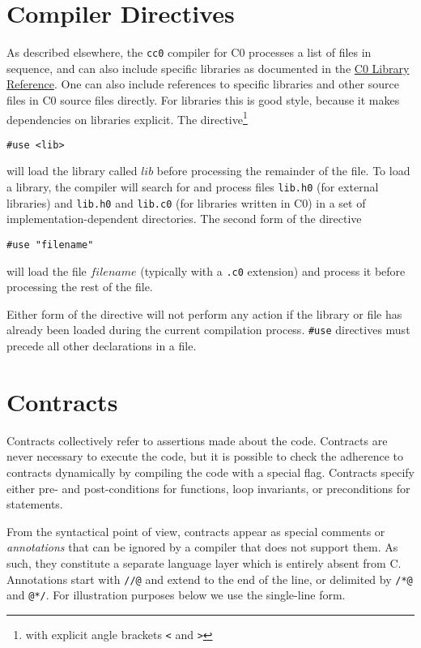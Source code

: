 \documentclass[11pt]{article}
\begin{document}
\section{Compiler Directives}

As described elsewhere, the \verb'cc0' compiler for C0 processes a
list of files in sequence, and can also include specific libraries as
documented in the
\href{http://www.cs.cmu.edu/~fp/courses/15122-s11/misc/c0-libraries.pdf}{C0
  Library Reference}.  One can also include references to specific
libraries and other source files in C0 source files directly.  For
libraries this is good style, because it makes dependencies on
libraries explicit.  The directive\footnote{with explicit angle
brackets \texttt{<} and \texttt{>}}
\begin{verbatim}
#use <lib>
\end{verbatim}
will load the library called $\mathit{lib}$ before processing the
remainder of the file.  To load a library, the compiler will search
for and process files \verb'lib.h0' (for external libraries) and
\verb'lib.h0' and \verb'lib.c0' (for libraries written in C0) in a set
of implementation-dependent directories.  The second form of the
directive
\begin{verbatim}
#use "filename"
\end{verbatim}
will load the file $\mathit{filename}$ (typically with a \verb'.c0'
extension) and process it before processing the rest of the file.

Either form of the directive will not perform any action if
the library or file has already been loaded during the current
compilation process.  \verb'#use' directives must precede all
other declarations in a file.

\section{Contracts}
\label{sec:contracts}

Contracts collectively refer to assertions made about the code.
Contracts are never necessary to execute the code, but it is possible
to check the adherence to contracts dynamically by compiling the code
with a special flag.  Contracts specify either pre- and post-conditions
for functions, loop invariants, or preconditions for statements.

From the syntactical point of view, contracts appear as special
comments or \emph{annotations} that can be ignored by a compiler that
does not support them.  As such, they constitute a separate language
layer which is entirely absent from C\@.  Annotations start with
\verb'//@' and extend to the end of the line, or delimited
by \verb'/*@' and \verb'@*/'.  For illustration purposes below
we use the single-line form.
\end{document}
